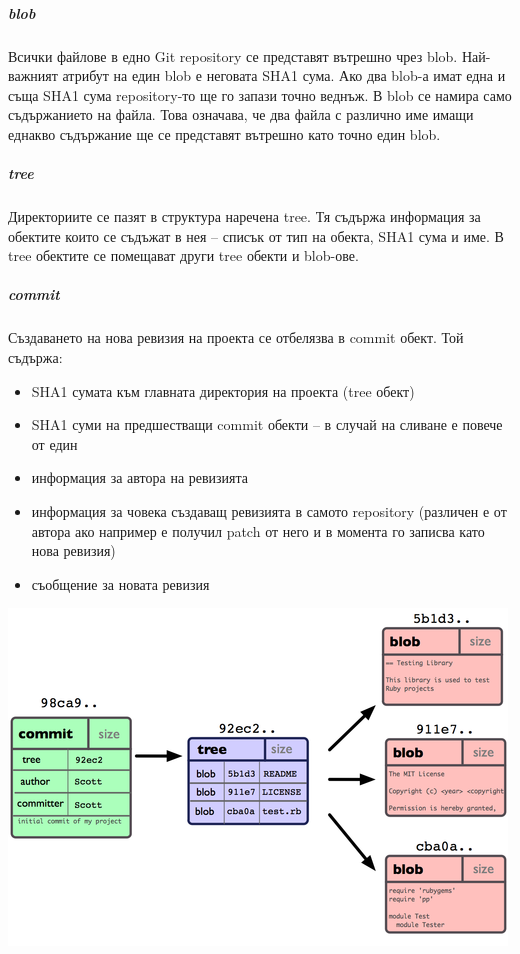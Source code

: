 \documentclass[a4paper]{article}
\begin{document}
      \subparagraph{blob}
      Всички файлове в едно Git repository се представят вътрешно чрез blob.
      Най-важният атрибут на един blob е неговата SHA1 сума. Ако два blob-а
      имат една и съща SHA1 сума repository-то ще го запази точно веднъж.
      В blob се намира само съдържанието на файла. Това означава, че два файла
      с различно име имащи еднакво съдържание ще се представят вътрешно като
      точно един blob.

      \subparagraph{tree}
      Директориите се пазят в структура наречена tree. Тя съдържа информация за обектите които се съдъжат в нея -- списък от тип на обекта, SHA1 сума и име. В tree обектите се помещават други tree обекти и blob-ове.

      \subparagraph{commit}
      Създаването на нова ревизия на проекта се отбелязва в commit обект. Той съдържа:
      \begin{itemize}
        \item SHA1 сумата към главната директория на проекта (tree обект)
        \item SHA1 суми на предшестващи commit обекти -- в случай на сливане е повече от един
        \item информация за автора на ревизията
        \item информация за човека създаващ ревизията в самото repository
        (различен е от автора ако например е получил patch от него и в момента
        го записва като нова ревизия)
        \item съобщение за новата ревизия
      \end{itemize}

      \includegraphics[scale=1.0]{git_commit.png}
\end{document}
